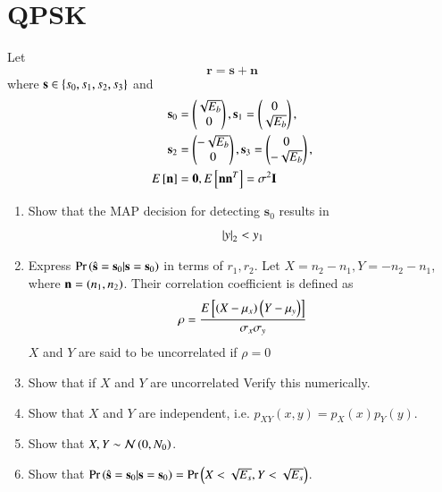 \documentclass[journal,12pt,twocolumn]{IEEEtran}
\begin{document}
\section{QPSK}
\begin{problem}
Let
\begin{equation}
\mathbf{r} = \mathbf{s}+ \mathbf{n}
\end{equation}
where $\mathbf{s} \in \left\{s_0,s_1,s_2, s_3\right\}$ and
\begin{align}
\mathbf{s}_0 &= 
\begin{pmatrix*}
\sqrt{E_b}\\
0
\end{pmatrix*},
\mathbf{s}_1 = 
\begin{pmatrix*}
0\\
\sqrt{E_b}
\end{pmatrix*},
\\
\mathbf{s}_2 &= 
\begin{pmatrix*}
-\sqrt{E_b}\\
0
\end{pmatrix*},
\mathbf{s}_3 = 
\begin{pmatrix*}
0\\
-\sqrt{E_b}
\end{pmatrix*},
\\
E\sbrak{\mathbf{n}} &= \mathbf{0}, E\sbrak{\mathbf{n}\mathbf{n}^T} = \sigma^2 \mathbf{I}
\end{align}
%
\begin{enumerate}
\item Show that the MAP decision for detecting $\mathbf{s}_0$ results in
\begin{equation}
\left\vert y\right\vert_2 < y_1
\end{equation}
\item Express $\Pr\left(\hat{\mathbf{s}} = \mathbf{s}_0|\mathbf{s} = \mathbf{s}_0\right)$ in terms of $r_1, r_2$.
Let $X=n_2-n_1, Y = -n_2-n_1$, where $\mathbf{n}=\left(n_1,n_2\right)$.
Their correlation coefficient is defined as
%
\begin{align}
\rho = \frac{E{}\left[\left(X-\mu_x\right)\left(Y-\mu_y\right)\right]}{\sigma_x\sigma_y}
\end{align}
%
$X$ and $Y$ are said to be uncorrelated if $\rho = 0$
\item Show that if $X$ and $Y$ are uncorrelated 
Verify this numerically.
\item Show that $X$ and $Y$ are independent, i.e. $p_{XY}(x,y) = p_{X}(x)p_{Y}(y)$.
\item Show that $X,Y \sim \mathcal{N}\left(0,N_0\right)$.
\item Show that $\Pr\left(\hat{\mathbf{s}} = \mathbf{s}_0|\mathbf{s} = \mathbf{s}_0\right) =\Pr\left( X < \sqrt{E_s},  Y < \sqrt{E_s}\right)$.

\end{enumerate}
\end{problem}
\end{document}
